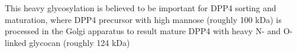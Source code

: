 This heavy glycosylation is believed to be important for DPP4 sorting and maturation, where DPP4 precursor with high mannose (roughly 100 kDa) is processed in the Golgi apparatus to result mature DPP4 with heavy N- and O-linked glycocan  (roughly 124 kDa)~\cite{Matter_1991}